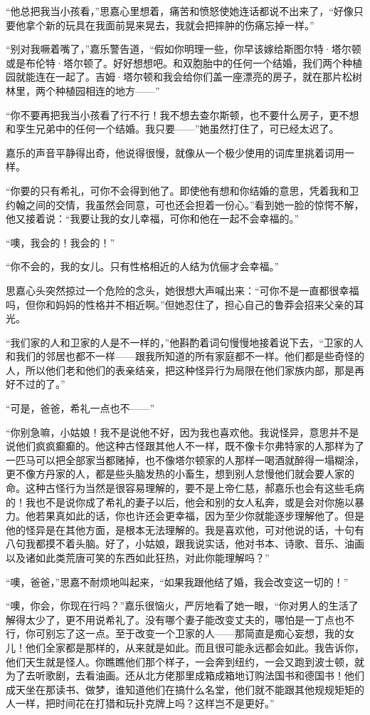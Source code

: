 \par “他总把我当小孩看，”思嘉心里想着，痛苦和愤怒使她连话都说不出来了，“好像只要他拿个新的玩具在我面前晃来晃去，我就会把摔肿的伤痛忘掉一样。”
\par “别对我噘着嘴了，”嘉乐警告道，“假如你明理一些，你早该嫁给斯图尔特·塔尔顿或是布伦特·塔尔顿了。好好想想吧。和双胞胎中的任何一个结婚，我们两个种植园就能连在一起了。吉姆·塔尔顿和我会给你们盖一座漂亮的房子，就在那片松树林里，两个种植园相连的地方——”
\par “你不要再把我当小孩看了行不行！我不想去查尔斯顿，也不要什么房子，更不想和孪生兄弟中的任何一个结婚。我只要——”她虽然打住了，可已经太迟了。
\par 嘉乐的声音平静得出奇，他说得很慢，就像从一个极少使用的词库里挑着词用一样。
\par “你要的只有希礼，可你不会得到他了。即使他有想和你结婚的意思，凭着我和卫约翰之间的交情，我虽然会同意，可也还会担着一份心。”看到她一脸的惊愕不解，他又接着说：“我要让我的女儿幸福，可你和他在一起不会幸福的。”
\par “噢，我会的！我会的！”
\par “你不会的，我的女儿。只有性格相近的人结为伉俪才会幸福。”
\par 思嘉心头突然掠过一个危险的念头，她很想大声喊出来：“可你不是一直都很幸福吗，但你和妈妈的性格并不相近啊。”但她忍住了，担心自己的鲁莽会招来父亲的耳光。
\par “我们家的人和卫家的人是不一样的，”他斟酌着词句慢慢地接着说下去，“卫家的人和我们的邻居也都不一样——跟我所知道的所有家庭都不一样。他们都是些奇怪的人，所以他们老和他们的表亲结亲，把这种怪异行为局限在他们家族内部，那是再好不过的了。”
\par “可是，爸爸，希礼一点也不——”
\par “你别急嘛，小姑娘！我不是说他不好，因为我也喜欢他。我说怪异，意思并不是说他们疯疯癫癫的。他这种古怪跟其他人不一样，既不像卡尔弗特家的人那样为了一匹马可以把全部家当都赌掉，也不像塔尔顿家的人那样一喝酒就醉得一塌糊涂，更不像方丹家的人，都是些头脑发热的小畜生，想到别人怠慢他们就会要人家的命。这种古怪行为当然是很容易理解的，要不是上帝仁慈，郝嘉乐也会有这些毛病的！我也不是说你成了希礼的妻子以后，他会和别的女人私奔，或是会对你施以暴力。他若果真如此的话，你也许还会更幸福，因为至少你就能逐步理解他了。但是他的怪异是在其他方面，是根本无法理解的。我是喜欢他，可对他说的话，十句有八句我都摸不着头脑。好了，小姑娘，跟我说实话，他对书本、诗歌、音乐、油画以及诸如此类荒唐可笑的东西如此狂热，对此你能理解吗？”
\par “噢，爸爸，”思嘉不耐烦地叫起来，“如果我跟他结了婚，我会改变这一切的！”
\par “噢，你会，你现在行吗？”嘉乐很恼火，严厉地看了她一眼，“你对男人的生活了解得太少了，更不用说希礼了。没有哪个妻子能改变丈夫的，哪怕是一丁点也不行，你可别忘了这一点。至于改变一个卫家的人——那简直是痴心妄想，我的女儿！他们全家都是那样的，从来就是如此。而且很可能永远都会如此。我告诉你，他们天生就是怪人。你瞧瞧他们那个样子，一会奔到纽约，一会又跑到波士顿，就为了去听歌剧，去看油画。还从北方佬那里成箱成箱地订购法国书和德国书！他们成天坐在那读书、做梦，谁知道他们在搞什么名堂，他们就不能跟其他规规矩矩的人一样，把时间花在打猎和玩扑克牌上吗？这样岂不是更好。”
